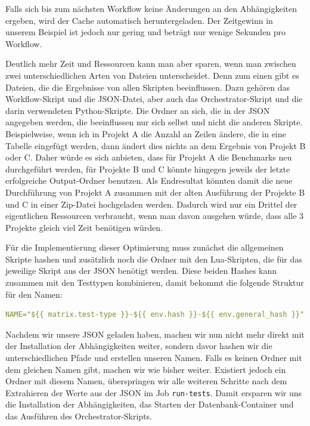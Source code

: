 \vspace{-5pt}

\vspace{-5pt}

Falls sich bis zum nächsten Workflow keine Änderungen an den Abhängigkeiten ergeben, wird der Cache automatisch heruntergeladen.
Der Zeitgewinn in unserem Beispiel ist jedoch nur gering und beträgt nur wenige Sekunden pro Workflow.

Deutlich mehr Zeit und Ressourcen kann man aber sparen, wenn man zwischen zwei unterschiedlichen Arten von Dateien unterscheidet.
Denn zum einen gibt es Dateien, die die Ergebnisse von allen Skripten beeinflussen.
Dazu gehören das Workflow-Skript und die JSON-Datei, aber auch das Orchestrator-Skript und die darin verwendeten Python-Skripte.
Die Ordner an sich, die in der JSON angegeben werden, die beeinflussen nur sich selbst und nicht die anderen Skripte.
Beispielweise, wenn ich in Projekt A die Anzahl an Zeilen ändere, die in eine Tabelle eingefügt werden, dann ändert dies nichts an dem Ergebnis von Projekt B oder C\@.
Daher würde es sich anbieten, dass für Projekt A die Benchmarks neu durchgeführt werden, für Projekte B und C könnte hingegen jeweils der letzte erfolgreiche Output-Ordner benutzen.
Als Endresultat könnten damit die neue Durchführung von Projekt A zusammen mit der alten Ausführung der Projekte B und C in einer Zip-Datei hochgeladen werden.
Dadurch wird nur ein Drittel der eigentlichen Ressourcen verbraucht, wenn man davon ausgehen würde, dass alle 3 Projekte gleich viel Zeit benötigen würden.

Für die Implementierung dieser Optimierung muss zunächst die allgemeinen Skripte hashen und zusätzlich noch die Ordner mit den Lua-Skripten, die für das jeweilige Skript aus der JSON benötigt werden.
Diese beiden Hashes kann zusammen mit den Testtypen kombinieren, damit bekommt die folgende Struktur für den Namen:

\vspace{-5pt}
\begin{lstlisting}[language=yaml,label={lst:tools-hash_name},style=custom_daniel]
NAME="${{ matrix.test-type }}-${{ env.hash }}-${{ env.general_hash }}"
\end{lstlisting}
\vspace{-5pt}

Nachdem wir unsere JSON geladen haben, machen wir nun nicht mehr direkt mit der Installation der Abhängigkeiten weiter, sondern davor hashen wir die unterschiedlichen Pfade und erstellen unseren Namen.
Falls es keinen Ordner mit dem gleichen Namen gibt, machen wir wie bisher weiter.
Existiert jedoch ein Ordner mit diesem Namen, überspringen wir alle weiteren Schritte nach dem Extrahieren der Werte aus der JSON im Job \texttt{run-tests}.
Damit ersparen wir uns die Installation der Abhängigkeiten, das Starten der Datenbank-Container und das Ausführen des Orchestrator-Skripts.

